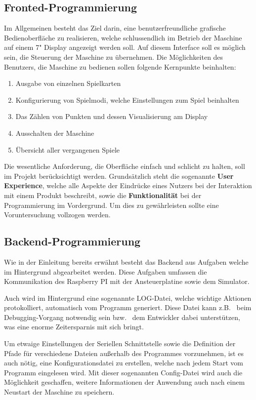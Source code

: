 \subsection{Fronted-Programmierung}\label{subsec:fronted-programmierung}
Im Allgemeinen besteht das Ziel darin, eine benutzerfreundliche grafische Bedienoberfläche zu realisieren, welche schlussendlich im Betrieb der Maschine auf einem 7" Display angezeigt werden soll.
Auf diesem Interface soll es möglich sein, die Steuerung der Maschine zu übernehmen.
Die Möglichkeiten des Benutzers, die Maschine zu bedienen sollen folgende Kernpunkte beinhalten:
\begin{enumerate}
    \item Ausgabe von einzelnen Spielkarten
    \item Konfigurierung von Spielmodi, welche Einstellungen zum Spiel beinhalten
    \item Das Zählen von Punkten und dessen Visualisierung am Display
    \item Ausschalten der Maschine
    \item Übersicht aller vergangenen Spiele
\end{enumerate}

Die wesentliche Anforderung, die Oberfläche einfach und schlicht zu halten, soll im Projekt berücksichtigt werden.
Grundsätzlich steht die sogenannte \textbf{User Experience}, welche alle Aspekte der Eindrücke eines Nutzers bei der Interaktion mit einem Produkt beschreibt, sowie die \textbf{Funktionalität} bei der Programmierung im Vordergrund.
Um dies zu gewährleisten sollte eine Voruntersuchung vollzogen werden.
\subsection{Backend-Programmierung}\label{subsec:backend-programmierung}
Wie in der Einleitung bereits erwähnt besteht das Backend aus Aufgaben welche im Hintergrund abgearbeitet werden.
Diese Aufgaben umfassen die Kommunikation des Raspberry PI mit der Ansteuerplatine sowie dem Simulator.

Auch wird im Hintergrund eine sogenannte LOG-Datei, welche wichtige Aktionen protokolliert, automatisch vom Programm generiert.
Diese Datei kann z.B. \ beim Debugging-Vorgang notwendig sein bzw. \ dem Entwickler dabei unterstützen, was eine enorme Zeitersparnis mit sich bringt.

Um etwaige Einstellungen der Seriellen Schnittstelle sowie die Definition der Pfade für verschiedene Dateien außerhalb des Programmes vorzunehmen, ist es auch nötig, eine Konfigurationsdatei zu erstellen, welche nach jedem Start vom Programm eingelesen wird.
Mit dieser sogenannten Config-Datei wird auch die Möglichkeit geschaffen, weitere Informationen der Anwendung auch nach einem Neustart der Maschine zu speichern.


